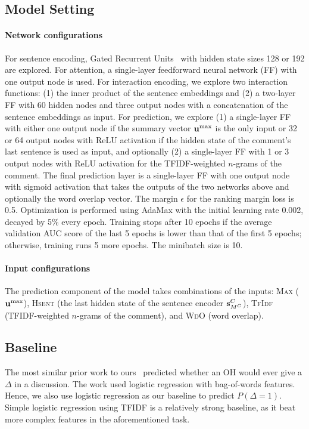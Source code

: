 \documentclass[11pt,a4paper]{article}
\newcommand{\hsent}{\textsc{Hsent}}
\newcommand{\tfidf}{\textsc{TfIdf}}
\newcommand{\wdo}{\textsc{WdO}}
\newcommand{\mmax}{\textsc{Max}}
\newcommand{\mmean}{\textsc{Mean}}
\begin{document}
\subsection{Model Setting}

\paragraph{Network configurations} For sentence encoding, Gated Recurrent Units~\cite{Cho:2014ua} with hidden state sizes 128 or 192 are explored.
For attention, a single-layer feedforward neural network (FF) with one output node is used. For interaction encoding, we explore two interaction functions: (1) the inner product of the sentence embeddings and (2) a two-layer FF with 60 hidden nodes and three output nodes with a concatenation of the sentence embeddings as input. For prediction, we explore (1) a single-layer FF with either one output node if the summary vector $\mathbf{u}^{\rm{max}}$ is the only input or 32 or 64 output nodes with ReLU activation if the hidden state of the comment's last sentence is used as input, and optionally (2) a single-layer FF with 1 or 3 output nodes with ReLU activation for the TFIDF-weighted $n$-grams of the comment.
The final prediction layer is a single-layer FF with one output node with sigmoid activation that takes the outputs of the two networks above and optionally the word overlap vector. 
The margin $\epsilon$ for the ranking margin loss is 0.5. Optimization is performed using AdaMax with the initial learning rate 0.002, decayed by 5\% every epoch. Training stops after 10 epochs if the average validation AUC score of the last 5 epochs is lower than that of the first 5 epochs; otherwise, training runs 5 more epochs. The minibatch size is 10.

\paragraph{Input configurations} The prediction component of the model takes combinations of the inputs: \mmax{} ($\mathbf{u}^{\rm{max}}$), 
\hsent{} (the last hidden state of the sentence encoder $\mathbf{s}^{C}_{M^C}$), \tfidf{} (TFIDF-weighted $n$-grams of the comment), and \wdo{} (word overlap).

\subsection{Baseline\label{sec:baselines}}
The most similar prior work to ours~ \cite{Tan:2016bk} predicted whether an OH would ever give a $\Delta$ in a discussion. The work used logistic regression with bag-of-words features. Hence, we also use logistic regression as our baseline to predict $P(\Delta = 1)$. Simple logistic regression using TFIDF is a relatively strong baseline, as it beat more complex features in the aforementioned task.
\end{document}
